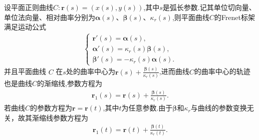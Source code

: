\documentclass[../../main.tex]{subfiles}%
\begin{document}
\begin{theorem}\label{theorem:平面曲线的Frenet公式和渐缩线公式}
设平面正则曲线$C:\bm{r}(s)=(x(s),y(s))$,其中$s$是弧长参数.记其单位切向量、单位法向量、相对曲率分别为$\bm{\alpha}(s)$、$\bm{\beta}(s)$、$\kappa_r(s)$,则平面曲线$C$的Frenet标架满足运动公式
\begin{align}\label{eq::20jrJIOUJFEIOJOJIUJN}
\begin{cases}
\bm{r}'(s)=\bm{\alpha}(s), \\
\bm{\alpha}'(s)=\kappa_r(s)\bm{\beta}(s), \\
\bm{\beta}'(s)=-\kappa_r(s)\bm{\alpha}(s).
\end{cases}
\end{align}
并且平面曲线 $C$ 在$s$处的曲率中心为$\boldsymbol{r}\left( s \right) +\frac{\boldsymbol{\beta }\left( s \right)}{\kappa _r\left( s \right)}$,进而曲线$C$的曲率中心的轨迹也是曲线$C$的渐缩线,参数方程为
\begin{align}
\bm{r}_1(s)=\boldsymbol{r}\left( s \right) +\frac{\boldsymbol{\beta }\left( s \right)}{\kappa _r\left( s \right)}. \label{eq:evolute}
\end{align}
若曲线$C$的参数方程为$\bm{r}=\bm{r}(t)$,其中$t$为任意参数.由于$\bm{\beta}$和$\kappa_r$与曲线的参数变换无关，故其渐缩线参数方程为
\begin{align*}
\bm{r}_1(t)=\boldsymbol{r}\left( t \right) +\frac{\boldsymbol{\beta }\left( t \right)}{\kappa _r\left( t \right)}. 
\end{align*}
\end{theorem}
\end{document}
